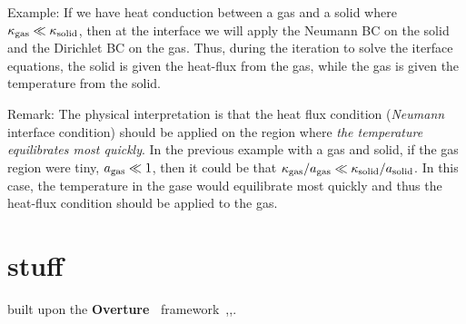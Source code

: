 \documentclass[11pt]{article}
\newcommand{\Overture}{{\bf Over\-ture\ }}
\begin{document}
Example: If we have heat conduction between a gas and a solid where $\kappa_{\rm gas} \ll \kappa_{\rm solid}$,
then at the interface we will apply the Neumann BC on the solid and the Dirichlet BC on the gas.  Thus,
during the iteration to solve the iterface equations, 
the solid is given the heat-flux from the gas, while the gas is given the temperature from the solid. 

Remark: The physical interpretation is that the heat flux condition ({\em Neumann} interface condition)
 should be applied on the region where {\em the temperature equilibrates most quickly}.
In the previous example with a gas and solid, if the gas region were tiny, $a_{\rm gas} \ll 1$, then it could be that 
$\kappa_{\rm gas}/a_{\rm gas} \ll \kappa_{\rm solid}/a_{\rm solid}$. In this case, the temperature in the gase 
would equilibrate most quickly and thus the heat-flux condition should be applied to the gas.

\section{stuff}
built upon the \Overture 
framework~\cite{Brown97},\cite{Henshaw96a},\cite{iscope97}. 

\vfill\eject




\printindex
\end{document}

